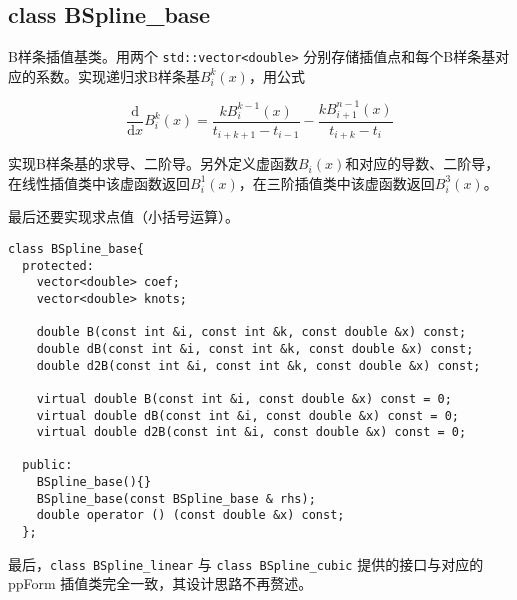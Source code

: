 \documentclass[lang=cn,11pt,a4paper]{elegantpaper}
\begin{document}
\subsection{class BSpline\_base}

B样条插值基类。用两个 \verb|std::vector<double>| 分别存储插值点和每个B样条基对应的系数。实现递归求B样条基$B_i^k(x)$，用公式

\begin{equation*}
  \frac{\text{d}}{\text{d} x} B_i^k(x) = \frac{k B_i^{k-1}(x)}{t_{i+k+1} - t_{i-1}} - \frac{k B_{i+1}^{n-1}(x)}{t_{i+k} - t_i}
\end{equation*}

实现B样条基的求导、二阶导。另外定义虚函数$B_i(x)$和对应的导数、二阶导，在线性插值类中该虚函数返回$B_i^1(x)$，在三阶插值类中该虚函数返回$B_i^3(x)$。

最后还要实现求点值（小括号运算）。

\begin{lstlisting}
class BSpline_base{
  protected:
    vector<double> coef;
    vector<double> knots;
    
    double B(const int &i, const int &k, const double &x) const;
    double dB(const int &i, const int &k, const double &x) const;
    double d2B(const int &i, const int &k, const double &x) const;

    virtual double B(const int &i, const double &x) const = 0;
    virtual double dB(const int &i, const double &x) const = 0;
    virtual double d2B(const int &i, const double &x) const = 0;
  
  public:
    BSpline_base(){}
    BSpline_base(const BSpline_base & rhs);
    double operator () (const double &x) const;
  };
\end{lstlisting}

最后，\verb|class BSpline_linear| 与 \verb|class BSpline_cubic| 提供的接口与对应的 ppForm 插值类完全一致，其设计思路不再赘述。
\end{document}
